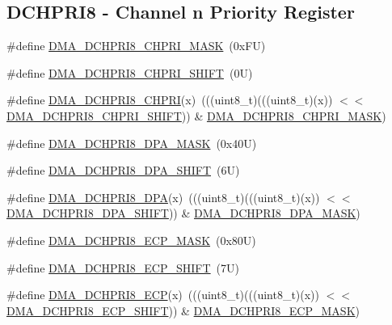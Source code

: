 \subsection*{D\+C\+H\+P\+R\+I8 -\/ Channel n Priority Register}
\begin{DoxyCompactItemize}
\item 
\#define \mbox{\hyperlink{group___d_m_a___register___masks_ga44efc2d24b92142a4be64cae219e4313}{D\+M\+A\+\_\+\+D\+C\+H\+P\+R\+I8\+\_\+\+C\+H\+P\+R\+I\+\_\+\+M\+A\+SK}}~(0x\+F\+U)
\item 
\#define \mbox{\hyperlink{group___d_m_a___register___masks_gae9ee24ab908f6a1a3551e5ae4bf0bcad}{D\+M\+A\+\_\+\+D\+C\+H\+P\+R\+I8\+\_\+\+C\+H\+P\+R\+I\+\_\+\+S\+H\+I\+FT}}~(0\+U)
\item 
\#define \mbox{\hyperlink{group___d_m_a___register___masks_gaa2368732a13adfa212beaf45f72e6ee0}{D\+M\+A\+\_\+\+D\+C\+H\+P\+R\+I8\+\_\+\+C\+H\+P\+RI}}(x)~(((uint8\+\_\+t)(((uint8\+\_\+t)(x)) $<$$<$ \mbox{\hyperlink{group___d_m_a___register___masks_gae9ee24ab908f6a1a3551e5ae4bf0bcad}{D\+M\+A\+\_\+\+D\+C\+H\+P\+R\+I8\+\_\+\+C\+H\+P\+R\+I\+\_\+\+S\+H\+I\+FT}})) \& \mbox{\hyperlink{group___d_m_a___register___masks_ga44efc2d24b92142a4be64cae219e4313}{D\+M\+A\+\_\+\+D\+C\+H\+P\+R\+I8\+\_\+\+C\+H\+P\+R\+I\+\_\+\+M\+A\+SK}})
\item 
\#define \mbox{\hyperlink{group___d_m_a___register___masks_ga65d73b58fdc371391eba07e59bec1292}{D\+M\+A\+\_\+\+D\+C\+H\+P\+R\+I8\+\_\+\+D\+P\+A\+\_\+\+M\+A\+SK}}~(0x40\+U)
\item 
\#define \mbox{\hyperlink{group___d_m_a___register___masks_gafb506e73fabed6916d50868ca9189bf4}{D\+M\+A\+\_\+\+D\+C\+H\+P\+R\+I8\+\_\+\+D\+P\+A\+\_\+\+S\+H\+I\+FT}}~(6\+U)
\item 
\#define \mbox{\hyperlink{group___d_m_a___register___masks_ga4ad52e6ce3ddec63e99fe776fb01a263}{D\+M\+A\+\_\+\+D\+C\+H\+P\+R\+I8\+\_\+\+D\+PA}}(x)~(((uint8\+\_\+t)(((uint8\+\_\+t)(x)) $<$$<$ \mbox{\hyperlink{group___d_m_a___register___masks_gafb506e73fabed6916d50868ca9189bf4}{D\+M\+A\+\_\+\+D\+C\+H\+P\+R\+I8\+\_\+\+D\+P\+A\+\_\+\+S\+H\+I\+FT}})) \& \mbox{\hyperlink{group___d_m_a___register___masks_ga65d73b58fdc371391eba07e59bec1292}{D\+M\+A\+\_\+\+D\+C\+H\+P\+R\+I8\+\_\+\+D\+P\+A\+\_\+\+M\+A\+SK}})
\item 
\#define \mbox{\hyperlink{group___d_m_a___register___masks_ga853ddcde9ef1ca6dcdb2a5742bb4c081}{D\+M\+A\+\_\+\+D\+C\+H\+P\+R\+I8\+\_\+\+E\+C\+P\+\_\+\+M\+A\+SK}}~(0x80\+U)
\item 
\#define \mbox{\hyperlink{group___d_m_a___register___masks_ga0717f20f481144abf2d14c7d9c67e289}{D\+M\+A\+\_\+\+D\+C\+H\+P\+R\+I8\+\_\+\+E\+C\+P\+\_\+\+S\+H\+I\+FT}}~(7\+U)
\item 
\#define \mbox{\hyperlink{group___d_m_a___register___masks_gac8f9916ed4ff72b4fe71646866f78946}{D\+M\+A\+\_\+\+D\+C\+H\+P\+R\+I8\+\_\+\+E\+CP}}(x)~(((uint8\+\_\+t)(((uint8\+\_\+t)(x)) $<$$<$ \mbox{\hyperlink{group___d_m_a___register___masks_ga0717f20f481144abf2d14c7d9c67e289}{D\+M\+A\+\_\+\+D\+C\+H\+P\+R\+I8\+\_\+\+E\+C\+P\+\_\+\+S\+H\+I\+FT}})) \& \mbox{\hyperlink{group___d_m_a___register___masks_ga853ddcde9ef1ca6dcdb2a5742bb4c081}{D\+M\+A\+\_\+\+D\+C\+H\+P\+R\+I8\+\_\+\+E\+C\+P\+\_\+\+M\+A\+SK}})
\end{DoxyCompactItemize}
